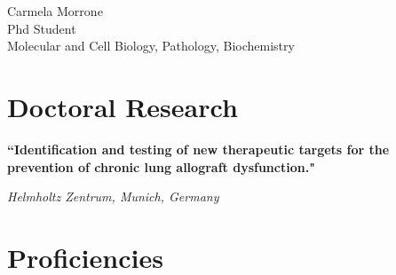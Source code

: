 \documentclass[10pt]{article} %
\begin{document}
\begin{paracol}{2} %


\parbox[top][0.12\textheight][c]{\linewidth}{ %
	\vspace{-0.04\textheight} %
	\centering %
	{\sffamily\Huge Carmela Morrone}\\\medskip %
	{\color{headings} \large Phd Student}\\\medskip 
	{\color{headings} Molecular and Cell Biology, Pathology, Biochemistry}
}


\section{Doctoral Research}

{\raggedright\textbf{``Identification and testing of new therapeutic targets for the prevention of
chronic lung allograft dysfunction."}\\\medskip}

\textit{Helmholtz Zentrum, Munich, Germany}
\medskip %


\section{Proficiencies}





\end{paracol}
\end{document}
